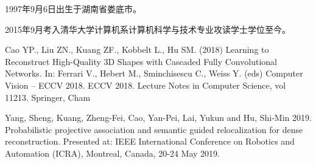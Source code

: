 \begin{resume}


  1997年9月6日出生于湖南省娄底市。

  2015年9月考入清华大学计算机系计算机科学与技术专业攻读学士学位至今。


  \begin{publications}
    \item Cao YP., Liu ZN., Kuang ZF., Kobbelt L., Hu SM. (2018) 
    Learning to Reconstruct High-Quality 3D Shapes with Cascaded Fully Convolutional Networks. 
    In: Ferrari V., Hebert M., Sminchisescu C., Weiss Y. (eds) Computer Vision – ECCV 2018. 
    ECCV 2018. Lecture Notes in Computer Science, vol 11213. Springer, Cham

    \item Yang, Sheng, Kuang, Zheng-Fei, Cao, Yan-Pei, Lai, Yukun and Hu, Shi-Min 2019. 
    Probabilistic projective association and semantic guided relocalization for dense reconstruction. 
    Presented at: IEEE International Conference on Robotics and Automation (ICRA), Montreal, Canada, 20-24 May 2019.  
  \end{publications}

\end{resume}
